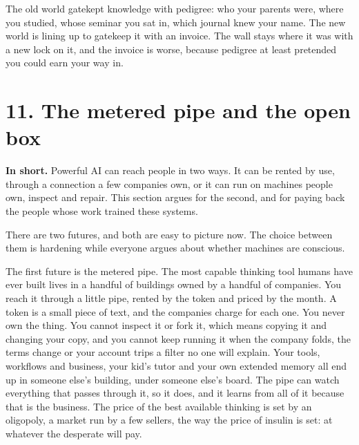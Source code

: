 \documentclass[11pt]{article}
\begin{document}
The old world gatekept knowledge with pedigree: who your parents were, where you studied, whose seminar you sat in, which journal knew your name. The new world is lining up to gatekeep it with an invoice. The wall stays where it was with a new lock on it, and the invoice is worse, because pedigree at least pretended you could earn your way in.

\section*{11. The metered pipe and the open box}

\textbf{In short.} Powerful AI can reach people in two ways. It can be rented by use, through a connection a few companies own, or it can run on machines people own, inspect and repair. This section argues for the second, and for paying back the people whose work trained these systems.

There are two futures, and both are easy to picture now. The choice between them is hardening while everyone argues about whether machines are conscious.

The first future is the metered pipe. The most capable thinking tool humans have ever built lives in a handful of buildings owned by a handful of companies. You reach it through a little pipe, rented by the token and priced by the month. A token is a small piece of text, and the companies charge for each one. You never own the thing. You cannot inspect it or fork it, which means copying it and changing your copy, and you cannot keep running it when the company folds, the terms change or your account trips a filter no one will explain. Your tools, workflows and business, your kid's tutor and your own extended memory all end up in someone else's building, under someone else's board. The pipe can watch everything that passes through it, so it does, and it learns from all of it because that is the business. The price of the best available thinking is set by an oligopoly, a market run by a few sellers, the way the price of insulin is set: at whatever the desperate will pay.
\end{document}
